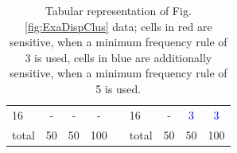 \begin{table}[H]
\begin{tabular}{|l|cc|c|  c  |l|cc|c|}
        16 & -  & -  & -  &  & 16 & - & \textcolor{blue}{3} & \textcolor{blue}{3}  \\
        \cline{1-4} \cline{6-9}
        \cline{1-4} \cline{6-9}
        total & 50 & 50 & 100 & & total & 50 & 50 & 100\\ 
        \cline{1-4} \cline{6-9}
    \end{tabular}
    \caption{Tabular representation of Fig. \ref{fig:ExaDispClus} data; cells in red are sensitive, when a minimum frequency rule of 3 is used, cells in blue are additionally sensitive, when a minimum frequency rule of 5 is used.}
    \label{tab:ExaDispClus}
\end{table}

